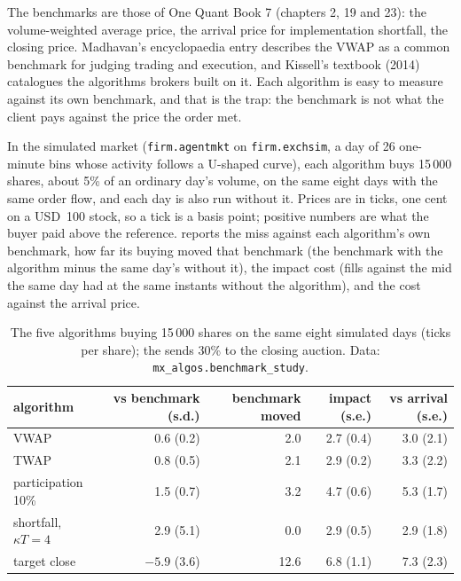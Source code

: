 The benchmarks are those of One Quant Book 7 (chapters 2, 19 and 23): the volume-weighted average price, the arrival price for implementation
shortfall, the closing price. Madhavan's encyclopaedia entry describes the VWAP as a common benchmark for judging trading and execution, and Kissell's
textbook (2014) catalogues the algorithms brokers built on it. Each algorithm is easy to measure against its own benchmark, and that is the trap:
the benchmark is not what the client pays against the price the order met.

In the simulated market (\texttt{firm.agentmkt} on \texttt{firm.exchsim}, a day of 26 one-minute bins whose activity follows a U-shaped curve), each
algorithm buys 15\,000 shares, about 5\% of an ordinary day's volume, on the same eight days with the same order flow, and each day is also run
without it. Prices are in ticks, one cent on a USD~100 stock, so a tick is a basis point; positive numbers are what the buyer paid above the
reference.  reports the miss against each algorithm's own benchmark, how far its buying moved that benchmark
(the benchmark with the algorithm minus the same day's without it), the impact cost (fills against the mid the same day had at the same instants
without the algorithm), and the cost against the arrival price.

\begin{table}[ht]
\centering
\small
\begin{tabular}{@{}lrrrr@{}}
\toprule
algorithm & vs benchmark (s.d.) & benchmark moved & impact (s.e.) & vs arrival (s.e.) \\
\midrule
VWAP & 0.6 (0.2) & 2.0 & 2.7 (0.4) & 3.0 (2.1) \\
TWAP & 0.8 (0.5) & 2.1 & 2.9 (0.2) & 3.3 (2.2) \\
participation 10\% & 1.5 (0.7) & 3.2 & 4.7 (0.6) & 5.3 (1.7) \\
shortfall, $\kappa T=4$ & 2.9 (5.1) & 0.0 & 2.9 (0.5) & 2.9 (1.8) \\
target close & $-5.9$ (3.6) & 12.6 & 6.8 (1.1) & 7.3 (2.3) \\
\bottomrule
\end{tabular}
\caption{The five algorithms buying 15\,000 shares on the same eight simulated days (ticks per share); the  sends 30\% to
the closing auction. Data:
\texttt{mx\_algos.benchmark\_study}.}\label{tab:mx:benchmark-algorithms:five}
\end{table}

